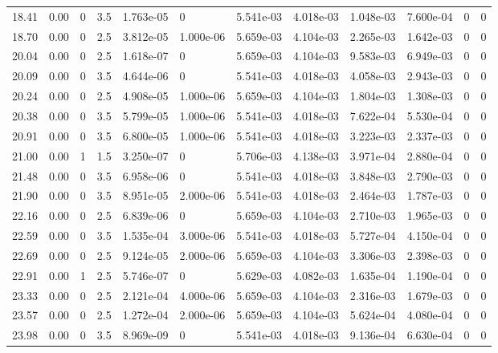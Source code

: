 \documentclass[preview]{standalone}
\begin{document}
{{{\begin{tabular}{L{1.2cm}C{1.2cm} C{0.3cm}C{0.5cm} C{1.4cm}C{1.4cm} C{1.4cm}C{1.4cm} C{1.6cm}C{1.6cm} C{1.6cm}C{1.6cm}}
  18.41  &  0.00  & 0     & 3.5 &  1.763e-05  & 0  &  5.541e-03&   4.018e-03& 1.048e-03 & 7.600e-04   &  0 & 0  \\ 
  18.70  &  0.00  & 0     & 2.5 &  3.812e-05  & 1.000e-06  &  5.659e-03&   4.104e-03& 2.265e-03 & 1.642e-03   &  0 & 0  \\ 
  20.04  &  0.00  & 0     & 2.5 &  1.618e-07  & 0  &  5.659e-03&   4.104e-03& 9.583e-03 & 6.949e-03   &  0 & 0  \\ 
  20.09  &  0.00  & 0     & 3.5 &  4.644e-06  & 0  &  5.541e-03&   4.018e-03& 4.058e-03 & 2.943e-03   &  0 & 0  \\ 
  20.24  &  0.00  & 0     & 2.5 &  4.908e-05  & 1.000e-06  &  5.659e-03&   4.104e-03& 1.804e-03 & 1.308e-03   &  0 & 0  \\ 
  20.38  &  0.00  & 0     & 3.5 &  5.799e-05  & 1.000e-06  &  5.541e-03&   4.018e-03& 7.622e-04 & 5.530e-04   &  0 & 0  \\ 
  20.91  &  0.00  & 0     & 3.5 &  6.800e-05  & 1.000e-06  &  5.541e-03&   4.018e-03& 3.223e-03 & 2.337e-03   &  0 & 0  \\ 
  21.00  &  0.00  & 1     & 1.5 &  3.250e-07  & 0  &  5.706e-03&   4.138e-03& 3.971e-04 & 2.880e-04   &  0 & 0  \\ 
  21.48  &  0.00  & 0     & 3.5 &  6.958e-06  & 0  &  5.541e-03&   4.018e-03& 3.848e-03 & 2.790e-03   &  0 & 0  \\ 
  21.90  &  0.00  & 0     & 3.5 &  8.951e-05  & 2.000e-06  &  5.541e-03&   4.018e-03& 2.464e-03 & 1.787e-03   &  0 & 0  \\ 
  22.16  &  0.00  & 0     & 2.5 &  6.839e-06  & 0  &  5.659e-03&   4.104e-03& 2.710e-03 & 1.965e-03   &  0 & 0  \\ 
  22.59  &  0.00  & 0     & 3.5 &  1.535e-04  & 3.000e-06  &  5.541e-03&   4.018e-03& 5.727e-04 & 4.150e-04   &  0 & 0  \\ 
  22.69  &  0.00  & 0     & 2.5 &  9.124e-05  & 2.000e-06  &  5.659e-03&   4.104e-03& 3.306e-03 & 2.398e-03   &  0 & 0  \\ 
  22.91  &  0.00  & 1     & 2.5 &  5.746e-07  & 0  &  5.629e-03&   4.082e-03& 1.635e-04 & 1.190e-04   &  0 & 0  \\ 
  23.33  &  0.00  & 0     & 2.5 &  2.121e-04  & 4.000e-06  &  5.659e-03&   4.104e-03& 2.316e-03 & 1.679e-03   &  0 & 0  \\ 
  23.57  &  0.00  & 0     & 2.5 &  1.272e-04  & 2.000e-06  &  5.659e-03&   4.104e-03& 5.624e-04 & 4.080e-04   &  0 & 0  \\ 
  23.98  &  0.00  & 0     & 3.5 &  8.969e-09  & 0  &  5.541e-03&   4.018e-03& 9.136e-04 & 6.630e-04   &  0 & 0  \\ 

\end{tabular}}}}
\end{document}
